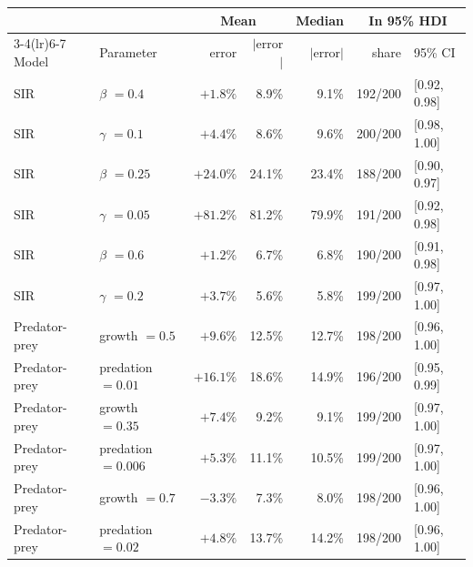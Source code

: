 \begin{tabular}{llrrrrl}
\toprule
 & & \multicolumn{2}{c}{Mean} & Median & \multicolumn{2}{c}{In 95\% HDI} \\ \cmidrule(lr){3-4}\cmidrule(lr){6-7} Model & Parameter & error & $|$error$|$ & $|$error$|$ & share & 95\% CI \\
\midrule
SIR & $\beta$ $= 0.4$ & $+1.8\%$ & 8.9\% & 9.1\% & 192/200 & [0.92, 0.98] \\
SIR & $\gamma$ $= 0.1$ & $+4.4\%$ & 8.6\% & 9.6\% & 200/200 & [0.98, 1.00] \\
SIR & $\beta$ $= 0.25$ & $+24.0\%$ & 24.1\% & 23.4\% & 188/200 & [0.90, 0.97] \\
SIR & $\gamma$ $= 0.05$ & $+81.2\%$ & 81.2\% & 79.9\% & 191/200 & [0.92, 0.98] \\
SIR & $\beta$ $= 0.6$ & $+1.2\%$ & 6.7\% & 6.8\% & 190/200 & [0.91, 0.98] \\
SIR & $\gamma$ $= 0.2$ & $+3.7\%$ & 5.6\% & 5.8\% & 199/200 & [0.97, 1.00] \\
Predator-prey & growth $= 0.5$ & $+9.6\%$ & 12.5\% & 12.7\% & 198/200 & [0.96, 1.00] \\
Predator-prey & predation $= 0.01$ & $+16.1\%$ & 18.6\% & 14.9\% & 196/200 & [0.95, 0.99] \\
Predator-prey & growth $= 0.35$ & $+7.4\%$ & 9.2\% & 9.1\% & 199/200 & [0.97, 1.00] \\
Predator-prey & predation $= 0.006$ & $+5.3\%$ & 11.1\% & 10.5\% & 199/200 & [0.97, 1.00] \\
Predator-prey & growth $= 0.7$ & $-3.3\%$ & 7.3\% & 8.0\% & 198/200 & [0.96, 1.00] \\
Predator-prey & predation $= 0.02$ & $+4.8\%$ & 13.7\% & 14.2\% & 198/200 & [0.96, 1.00] \\
\bottomrule
\end{tabular}
